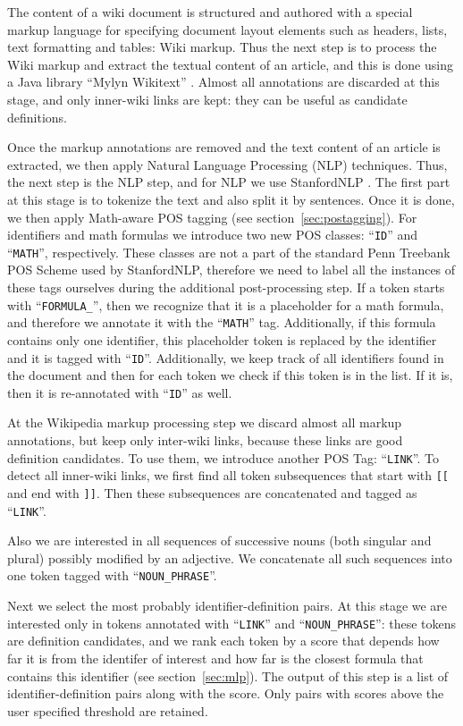 The content of a wiki document is structured and authored with a special 
markup language for specifying document layout elements such as
headers, lists, text formatting and tables: Wiki markup. 
Thus the next step is to process the Wiki markup and extract the textual 
content of an article, and this is done using a Java library 
``Mylyn Wikitext'' \cite{mylynwikitext}.
Almost all annotations are discarded at this stage,
and only inner-wiki links are kept: they can be useful as candidate definitions.

Once the markup annotations are removed and the text content of an article is 
extracted, we then apply Natural Language Processing (NLP) techniques.
Thus, the next step is the NLP step, and for NLP we use StanfordNLP
\cite{manning2014stanford}. 
The first part at this stage is to tokenize the text and also split it by sentences. 
Once it is done, we then apply Math-aware POS tagging
(see section~\ref{sec:postagging}).
For identifiers and math formulas we introduce two new POS classes: 
``\verb|ID|'' and ``\verb|MATH|'', respectively. 
These classes are not a part of the 
standard Penn Treebank POS Scheme \cite{santorini1990part} used by 
StanfordNLP, therefore we need to label all the instances of these tags ourselves 
during the additional post-processing step. If a token starts
with ``\verb|FORMULA_|'', then we recognize that it is a placeholder 
for a math formula, and therefore we annotate it with the ``\verb|MATH|''
tag. Additionally, if this formula contains only one identifier, this 
placeholder token is replaced by the identifier and it is tagged with 
``\verb|ID|''. Additionally, we keep track of all identifiers found in 
the document and then for each token we check if this token is in the list. 
If it is, then it is re-annotated with ``\verb|ID|'' as well.

At the Wikipedia markup processing step we discard almost all markup 
annotations, but keep only inter-wiki links, because these links
are good definition candidates. To use them, we introduce 
another POS Tag: ``\verb|LINK|''. To detect all inner-wiki links, 
we first find all token subsequences that start with \verb|[[| 
and end with \verb|]]|. 
Then these subsequences are concatenated and tagged as ``\verb|LINK|''.

Also we are interested in all sequences of successive nouns (both singular 
and plural) possibly modified by an adjective. We concatenate all
such sequences into one token tagged with ``\verb|NOUN_PHRASE|''.


Next we select the most probably identifier-definition pairs. 
At this stage we are interested only in tokens annotated with  ``\verb|LINK|''
and ``\verb|NOUN_PHRASE|'': these tokens are definition candidates, and 
we rank each token by a score that depends how far it is from the identifer
of interest and how far is the closest formula that contains this 
identifier (see section~\ref{sec:mlp}). 
The output of this step is a list of identifier-definition pairs along 
with the score. Only pairs with scores above the user specified  
threshold are retained. 

